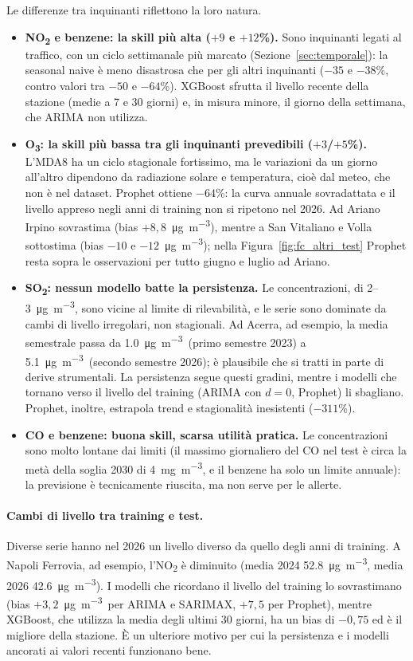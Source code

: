 \documentclass[11pt]{report}
\newcommand{\ugm}{\si{\micro\gram\per\cubic\metre}}
\newcommand{\mgm}{\si{\milli\gram\per\cubic\metre}}
\begin{document}
Le differenze tra inquinanti riflettono la loro natura.
\begin{itemize}
  \item \textbf{NO\textsubscript{2} e benzene: la skill più alta ($+9$ e $+12$\%).}
        Sono inquinanti legati al traffico, con un ciclo settimanale più marcato
        (Sezione~\ref{sec:temporale}): la seasonal naive è meno disastrosa che per
        gli altri inquinanti ($-35$ e $-38$\%, contro valori tra $-50$ e $-64$\%).
        XGBoost sfrutta il livello recente della stazione (medie a 7 e 30 giorni)
        e, in misura minore, il giorno della settimana, che ARIMA non utilizza.
  \item \textbf{O\textsubscript{3}: la skill più bassa tra gli inquinanti
        prevedibili ($+3$/$+5$\%).} L'MDA8 ha un ciclo stagionale fortissimo, ma le
        variazioni da un giorno all'altro dipendono da radiazione solare e
        temperatura, cioè dal meteo, che non è nel dataset. Prophet ottiene
        $-64$\%: la curva annuale sovradattata e il livello appreso negli anni di
        training non si ripetono nel 2026. Ad Ariano Irpino sovrastima (bias
        $+8{,}8$~\ugm), mentre a San Vitaliano e Volla sottostima (bias $-10$ e
        $-12$~\ugm); nella Figura~\ref{fig:fc_altri_test} Prophet resta sopra le
        osservazioni per tutto giugno e luglio ad Ariano.
  \item \textbf{SO\textsubscript{2}: nessun modello batte la persistenza.} Le
        concentrazioni, di 2--3~\ugm, sono vicine al limite di rilevabilità, e le
        serie sono dominate da cambi di livello irregolari, non stagionali. Ad
        Acerra, ad esempio, la media semestrale passa da \num{1.0}~\ugm\ (primo
        semestre 2023) a \num{5.1}~\ugm\ (secondo semestre 2026); è plausibile che
        si tratti in parte di derive strumentali. La persistenza segue questi
        gradini, mentre i modelli che tornano verso il livello del training (ARIMA
        con $d=0$, Prophet) li sbagliano. Prophet, inoltre, estrapola trend e
        stagionalità inesistenti ($-311$\%).
  \item \textbf{CO e benzene: buona skill, scarsa utilità pratica.} Le
        concentrazioni sono molto lontane dai limiti (il massimo giornaliero del CO
        nel test è circa la metà della soglia 2030 di 4~\mgm, e il benzene ha solo
        un limite annuale): la previsione è tecnicamente riuscita, ma non serve per
        le allerte.
\end{itemize}

\paragraph{Cambi di livello tra training e test.} Diverse serie hanno nel 2026 un
livello diverso da quello degli anni di training. A Napoli Ferrovia, ad esempio,
l'NO\textsubscript{2} è diminuito (media 2024 \num{52.8}~\ugm, media 2026
\num{42.6}~\ugm). I modelli che ricordano il livello del training lo sovrastimano
(bias $+3{,}2$~\ugm\ per ARIMA e SARIMAX, $+7{,}5$ per Prophet), mentre XGBoost, che
utilizza la media degli ultimi 30 giorni, ha un bias di $-0{,}75$ ed è il migliore
della stazione. È un ulteriore motivo per cui la persistenza e i modelli ancorati
ai valori recenti funzionano bene.
\end{document}

